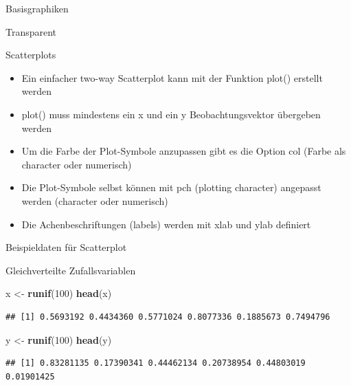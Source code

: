 \documentclass[ignorenonframetext,]{beamer}
\newenvironment{Shaded}{}{}
\newcommand{\KeywordTok}[1]{\textcolor[rgb]{0.00,0.44,0.13}{\textbf{{#1}}}}
\newcommand{\DecValTok}[1]{\textcolor[rgb]{0.25,0.63,0.44}{{#1}}}
\newcommand{\StringTok}[1]{\textcolor[rgb]{0.25,0.44,0.63}{{#1}}}
\newcommand{\NormalTok}[1]{{#1}}
\providecommand{\tightlist}{%
\setlength{\itemsep}{0pt}\setlength{\parskip}{0pt}}
\begin{document}
\begin{frame}[fragile]{Basisgraphiken}
\begin{block}{Transparent}
\end{block}

\begin{block}{Scatterplots}

\begin{itemize}
\tightlist
\item
  Ein einfacher two-way Scatterplot kann mit der Funktion plot()
  erstellt werden
\item
  plot() muss mindestens ein x und ein y Beobachtungsvektor übergeben
  werden
\item
  Um die Farbe der Plot-Symbole anzupassen gibt es die Option col (Farbe
  als character oder numerisch)
\item
  Die Plot-Symbole selbst können mit pch (plotting character) angepasst
  werden (character oder numerisch)
\item
  Die Achenbeschriftungen (labels) werden mit xlab und ylab definiert
\end{itemize}

\end{block}

\begin{block}{Beispieldaten für Scatterplot}

\begin{block}{Gleichverteilte Zufallsvariablen}

\begin{Shaded}
\begin{Highlighting}[]
\NormalTok{x <-}\StringTok{ }\KeywordTok{runif}\NormalTok{(}\DecValTok{100}\NormalTok{)}
\KeywordTok{head}\NormalTok{(x)}
\end{Highlighting}
\end{Shaded}

\begin{verbatim}
## [1] 0.5693192 0.4434360 0.5771024 0.8077336 0.1885673 0.7494796
\end{verbatim}

\begin{Shaded}
\begin{Highlighting}[]
\NormalTok{y <-}\StringTok{ }\KeywordTok{runif}\NormalTok{(}\DecValTok{100}\NormalTok{)}
\KeywordTok{head}\NormalTok{(y)}
\end{Highlighting}
\end{Shaded}

\begin{verbatim}
## [1] 0.83281135 0.17390341 0.44462134 0.20738954 0.44803019 0.01901425
\end{verbatim}


\end{block}
\end{block}
\end{frame}
\end{document}
